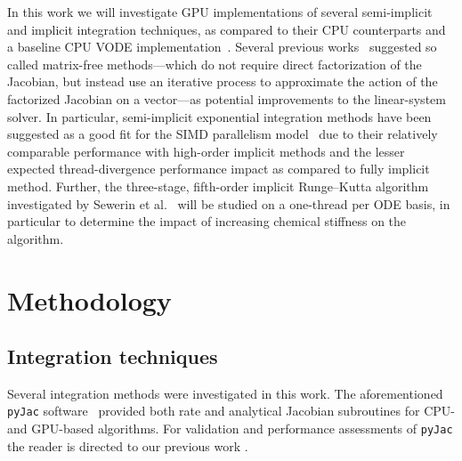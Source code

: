 \documentclass[preprint,12pt]{elsarticle}
\begin{document}
In this work we will investigate GPU implementations of several semi-implicit and implicit integration techniques, as compared to their CPU counterparts and a baseline CPU VODE implementation~\cite{Hindmarsh:2005hg}.
Several previous works~\cite{Stone:2013aa,Bisetti:2012jw,Niemeyer:2014aa,Perini20141180,McNenly2015581} suggested so called matrix-free methods---which do not require direct factorization of the Jacobian, but instead use an iterative process to approximate the action of the factorized Jacobian on a vector---as potential improvements to the linear-system solver.
In particular, semi-implicit exponential integration methods have been suggested as a good fit for the SIMD parallelism model~\cite{Stone:2013aa,Bisetti:2012jw,Niemeyer:2014aa} due to their relatively comparable performance with high-order implicit methods and the lesser expected thread-divergence performance impact as compared to fully implicit method.
Further, the three-stage, fifth-order implicit Runge--Kutta algorithm~\cite{hairer1996solving} investigated by Sewerin et al.~\cite{Sewerin20151375} will be studied on a one-thread per ODE basis, in particular to determine the impact of increasing chemical stiffness on the algorithm.


\section{Methodology}
\label{sec:Method}

\subsection{Integration techniques}

Several integration methods were investigated in this work.
The aforementioned \texttt{pyJac} software~\cite{Niemeyer:2015im} provided both rate and analytical Jacobian subroutines for CPU- and GPU-based algorithms.
For validation and performance assessments of \texttt{pyJac} the reader is directed to our previous work \cite{Niemeyer:2015ws}.
\end{document}
